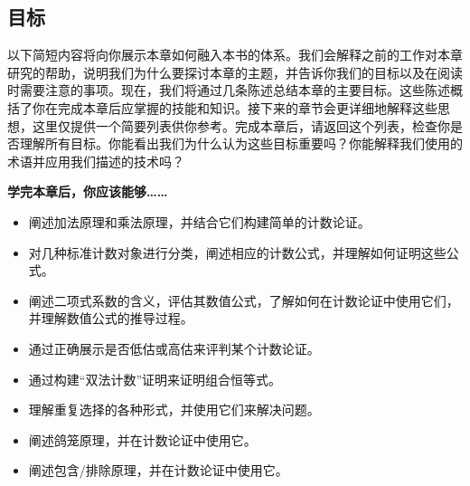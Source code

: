 
\subsection{目标}

以下简短内容将向你展示本章如何融入本书的体系。我们会解释之前的工作对本章研究的帮助，说明我们为什么要探讨本章的主题，并告诉你我们的目标以及在阅读时需要注意的事项。现在，我们将通过几条陈述总结本章的主要目标。这些陈述概括了你在完成本章后应掌握的技能和知识。接下来的章节会更详细地解释这些思想，这里仅提供一个简要列表供你参考。完成本章后，请返回这个列表，检查你是否理解所有目标。你能看出我们为什么认为这些目标重要吗？你能解释我们使用的术语并应用我们描述的技术吗？

\textbf{学完本章后，你应该能够……}

\begin{itemize}
    \item 阐述加法原理和乘法原理，并结合它们构建简单的计数论证。
    \item 对几种标准计数对象进行分类，阐述相应的计数公式，并理解如何证明这些公式。
    \item 阐述二项式系数的含义，评估其数值公式，了解如何在计数论证中使用它们，并理解数值公式的推导过程。
    \item 通过正确展示是否低估或高估来评判某个计数论证。
    \item 通过构建``双法计数''证明来证明组合恒等式。
    \item 理解重复选择的各种形式，并使用它们来解决问题。
    \item 阐述鸽笼原理，并在计数论证中使用它。
    \item 阐述包含/排除原理，并在计数论证中使用它。
\end{itemize}